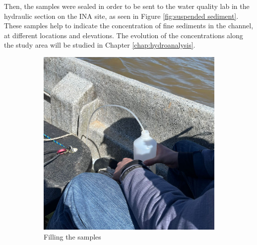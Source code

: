 Then, the samples were sealed in order to be sent to the water quality lab in the hydraulic section on the INA site, as seen in Figure \ref{fig:suspended sediment}. These samples help to indicate the concentration of fine sediments in the channel, at different locations and elevations. The evolution of the concentrations along the study area will be studied in Chapter \ref{chap:hydroanalysis}.

\begin{figure}[H]
    \centering
    \begin{subfigure}[t]{0.48\textwidth}
        \centering
        \includegraphics[width=\linewidth]{figures/ch4/fles.jpg}
        \caption{Filling the samples}
    \end{subfigure}
    \hfill
    \begin{subfigure}[t]{0.48\textwidth}
        \centering

\end{subfigure}
\end{figure}
